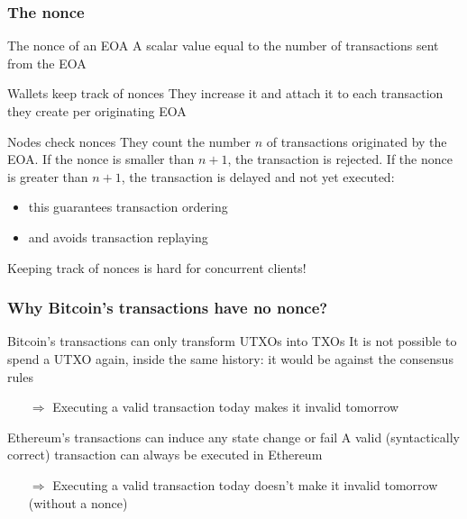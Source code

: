 \documentclass[11pt]{beamer}  %
\begin{document}
\begin{frame}\frametitle{The nonce}

  \begin{greenbox}{The nonce of an EOA}
    A scalar value equal to the number of transactions sent from the EOA
  \end{greenbox}

  \bigskip

  \begin{greenbox}{Wallets keep track of nonces}
    They increase it and attach it to each transaction they create per
    originating EOA
  \end{greenbox}

  \bigskip

  \begin{greenbox}{Nodes check nonces}
    They count the number $n$ of transactions originated
    by the EOA. If the nonce is smaller than $n+1$, the
    transaction is rejected. If the nonce is greater than $n+1$,
    the transaction is delayed and not yet executed:
    \begin{itemize}
    \item this guarantees transaction ordering
    \item and avoids transaction replaying
    \end{itemize}
  \end{greenbox}

  \bigskip

  \begin{redbox}{}
    \begin{center}
      Keeping track of nonces is hard for concurrent clients!
    \end{center}
  \end{redbox}

\end{frame}

\begin{frame}\frametitle{Why Bitcoin's transactions have no nonce?}

  \begin{greenbox}{Bitcoin's transactions can only transform UTXOs into TXOs}
    It is not possible to spend a UTXO again, inside the same history:
    it would be against the consensus rules
    \begin{itemize}
    \item[$\Rightarrow$] Executing a valid transaction today makes it invalid tomorrow
    \end{itemize}
  \end{greenbox}

  \bigskip

  \begin{greenbox}{Ethereum's transactions can induce any state change or fail}
    A valid (syntactically correct) transaction can always be executed in Ethereum
    \begin{itemize}
    \item[$\Rightarrow$] Executing a valid transaction today doesn't make it invalid tomorrow
      \alert{(without a nonce)}
    \end{itemize}
  \end{greenbox}

\end{frame}
\end{document}
